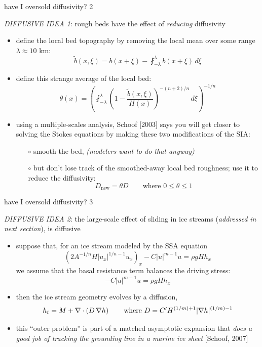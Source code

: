 \begin{frame}{have I oversold diffusivity? 2}

\emph{DIFFUSIVE IDEA 1}: rough beds have the effect of \emph{reducing} diffusivity
\begin{itemize}
\item define the local bed topography by removing the local mean over some range $\lambda \approx 10$ km:
\small
   $$\tilde b(x,\xi) = b(x+\xi) - \fint_{-\lambda}^\lambda b(x+\xi)\,d\xi$$
\normalsize
\item define this strange average of the local bed:
\small
	$$\theta(x) = \left(\fint_{-\lambda}^\lambda \left(1 - \frac{\tilde b(x,\xi)}{H(x)}
                           \right)^{-(n+2)/n}\,d\xi\right)^{-1/n}$$
\normalsize
\item using a multiple-scales analysis, Schoof [2003]\nocite{Schoofbasaltopg2003} says you will get closer to solving the Stokes equations by making these two modifications of the SIA:
  \begin{itemize}
  \item[$\circ$] smooth the bed, \qquad \tiny \emph{(modelers want to do that anyway)} \small
  \item[$\circ$] but don't lose track of the smoothed-away local bed roughness; use it to reduce the diffusivity:
  \small
  		$$D_{\text{new}} = \theta D \qquad \text{where } 0 \le \theta \le 1$$
  \end{itemize}
\end{itemize}
\end{frame}


\begin{frame}{have I oversold diffusivity? 3}

\emph{DIFFUSIVE IDEA 2}: the large-scale effect of sliding in ice streams (\emph{addressed in next section}), is diffusive
\begin{itemize}
\item suppose that, for an ice stream modeled by the SSA equation
   $$\left(2 A^{-1/n} H |u_x|^{1/n - 1} u_x \right)_x - C|u|^{m-1}u = \rho g H h_x$$
we assume that the basal resistance term balances the driving stress:
   $$- C|u|^{m-1}u = \rho g H h_x$$
\item then the ice stream geometry evolves by a diffusion,
	$$h_t = M + \nabla\cdot\left(D\,\nabla h\right) \qquad \text{where } D = C' H^{(1/m)+1}|\nabla h|^{(1/m)-1}$$
\item this ``outer problem'' is part of a matched asymptotic expansion that \emph{does a good job of tracking the grounding line in a marine ice sheet} [Schoof, 2007]
\end{itemize}
\end{frame}

